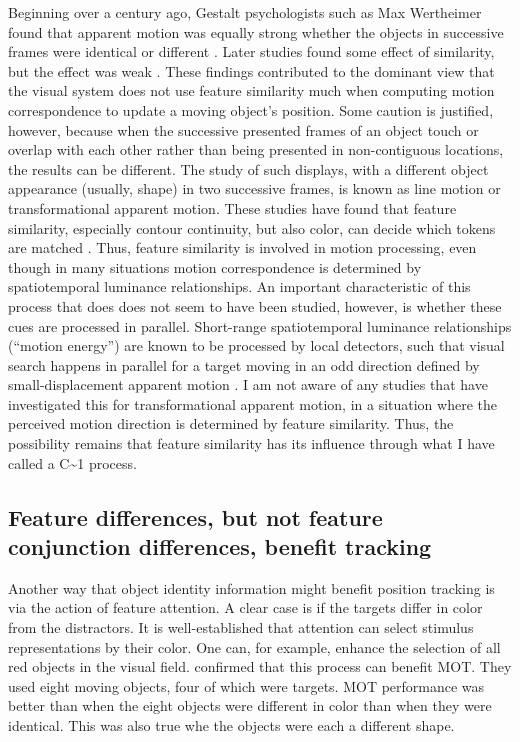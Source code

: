 \documentclass[
]{book}
\begin{document}
Beginning over a century ago, Gestalt psychologists such as Max Wertheimer found that apparent motion was equally strong whether the objects in successive frames were identical or different \citep{wertheimerExperimentelleStudienUber1912}. Later studies found some effect of similarity, but the effect was weak \citep{kolersFiguralChangeApparent1971, burtTimeDistanceFeature1981}. These findings contributed to the dominant view that the visual system does not use feature similarity much when computing motion correspondence to update a moving object's position. Some caution is justified, however, because
when the successive presented frames of an object touch or overlap with each other rather than being presented in non-contiguous locations, the results can be different. The study of such displays, with a different object appearance (usually, shape) in two successive frames, is known as line motion or transformational apparent motion. These studies have found that feature similarity, especially contour continuity, but also color, can decide which tokens are matched \citep{faubertInfluenceTwoSpatially1995, tseRoleParsingHighlevel1998}. Thus, feature similarity is involved in motion processing, even though in many situations motion correspondence is determined by spatiotemporal luminance relationships. An important characteristic of this process that does does not seem to have been studied, however, is whether these cues are processed in parallel. Short-range spatiotemporal luminance relationships (``motion energy'') are known to be processed by local detectors, such that visual search happens in parallel for a target moving in an odd direction defined by small-displacement apparent motion \citep{horowitzAttentionApparentMotion1994}. I am not aware of any studies that have investigated this for transformational apparent motion, in a situation where the perceived motion direction is determined by feature similarity. Thus, the possibility remains that feature similarity has its influence through what I have called a C\textasciitilde1 process.

\hypertarget{feature-differences-but-not-feature-conjunction-differences-benefit-tracking}{%
\subsection{Feature differences, but not feature conjunction differences, benefit tracking}\label{feature-differences-but-not-feature-conjunction-differences-benefit-tracking}}

Another way that object identity information might benefit position tracking is via the action of feature attention. A clear case is if the targets differ in color from the distractors. It is well-established that attention can select stimulus representations by their color. One can, for example, enhance the selection of all red objects in the visual field. \citet{makovskiFeatureBindingAttentive2009} confirmed that this process can benefit MOT. They used eight moving objects, four of which were targets. MOT performance was better than when the eight objects were different in color than when they were identical. This was also true whe the objects were each a different shape.
\end{document}
